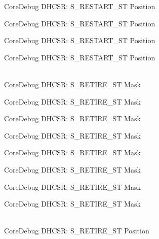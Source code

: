 \begin{DoxyRefList}
\label{deprecated__deprecated000303}%
%
Core\+Debug DHCSR:\+ S\+\_\+\+RESTART\+\_\+\+ST Position 

\label{deprecated__deprecated000379}%
%
Core\+Debug DHCSR:\+ S\+\_\+\+RESTART\+\_\+\+ST Position 

\label{deprecated__deprecated000458}%
%
Core\+Debug DHCSR:\+ S\+\_\+\+RESTART\+\_\+\+ST Position 

\label{deprecated__deprecated000560}%
%
Core\+Debug DHCSR:\+ S\+\_\+\+RESTART\+\_\+\+ST Position  
\item[{\parbox[t]{\linewidth}{Global \doxylink{group__CMSIS__CoreDebug_ga89dceb5325f6bcb36a0473d65fbfcfa6}{Core\+Debug\+\_\+\+DHCSR\+\_\+\+S\+\_\+\+RETIRE\+\_\+\+ST\+\_\+\+Msk} }}]\hfill \\
\label{deprecated__deprecated000012}%
%
Core\+Debug DHCSR:\+ S\+\_\+\+RETIRE\+\_\+\+ST Mask 

\label{deprecated__deprecated000112}%
%
Core\+Debug DHCSR:\+ S\+\_\+\+RETIRE\+\_\+\+ST Mask 

\label{deprecated__deprecated000166}%
%
Core\+Debug DHCSR:\+ S\+\_\+\+RETIRE\+\_\+\+ST Mask 

\label{deprecated__deprecated000251}%
%
Core\+Debug DHCSR:\+ S\+\_\+\+RETIRE\+\_\+\+ST Mask 

\label{deprecated__deprecated000308}%
%
Core\+Debug DHCSR:\+ S\+\_\+\+RETIRE\+\_\+\+ST Mask 

\label{deprecated__deprecated000384}%
%
Core\+Debug DHCSR:\+ S\+\_\+\+RETIRE\+\_\+\+ST Mask 

\label{deprecated__deprecated000463}%
%
Core\+Debug DHCSR:\+ S\+\_\+\+RETIRE\+\_\+\+ST Mask 

\label{deprecated__deprecated000565}%
%
Core\+Debug DHCSR:\+ S\+\_\+\+RETIRE\+\_\+\+ST Mask  
\item[{\parbox[t]{\linewidth}{Global \doxylink{group__CMSIS__CoreDebug_ga2328118f8b3574c871a53605eb17e730}{Core\+Debug\+\_\+\+DHCSR\+\_\+\+S\+\_\+\+RETIRE\+\_\+\+ST\+\_\+\+Pos} }}]\hfill \\
\label{deprecated__deprecated000011}%
%
Core\+Debug DHCSR:\+ S\+\_\+\+RETIRE\+\_\+\+ST Position 


\end{DoxyRefList}
